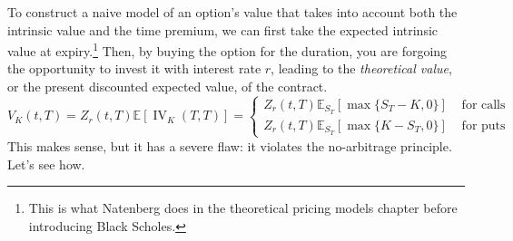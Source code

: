 \documentclass{article}
\DeclareMathOperator{\IV}{IV}
\begin{document}
    To construct a naive model of an option's value that takes into account both the intrinsic value and the time premium, we can first take the expected intrinsic value at expiry.\footnote{This is what Natenberg does in the theoretical pricing models chapter before introducing Black Scholes.} Then, by buying the option for the duration, you are forgoing the opportunity to invest it with interest rate $r$, leading to the \textit{theoretical value}, or the present discounted expected value, of the contract. 
    \begin{equation}
      V_K (t, T) = Z_r (t, T) \mathbb{E} [\IV_K(T, T)]  = \begin{cases} 
        Z_r (t, T) \mathbb{E}_{S_T} [ \max\{S_T - K, 0 \}] & \text{ for calls} \\ 
        Z_r (t, T) \mathbb{E}_{S_T} [ \max\{K - S_T, 0 \}] & \text{ for puts}
      \end{cases}
    \end{equation}
    This makes sense, but it has a severe flaw: it violates the no-arbitrage principle. Let's see how. 
\end{document}
